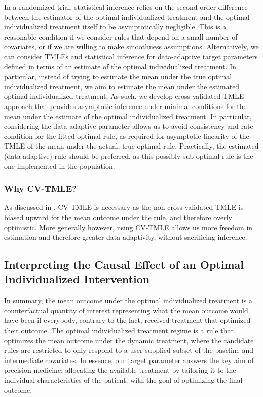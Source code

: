\documentclass[12pt, krantz2,]{krantz}
\theoremstyle{definition}
\theoremstyle{definition}
\theoremstyle{definition}
\newcommand{\1}{\mathbbm{1}}
\begin{document}
In a randomized trial, statistical inference relies on the second-order
difference between the estimator of the optimal individualized treatment and the
optimal individualized treatment itself to be asymptotically negligible. This is
a reasonable condition if we consider rules that depend on a small number of
covariates, or if we are willing to make smoothness assumptions. Alternatively,
we can consider TMLEs and statistical inference for data-adaptive target
parameters defined in terms of an estimate of the optimal individualized
treatment. In particular, instead of trying to estimate the mean under the true
optimal individualized treatment, we aim to estimate the mean under the
estimated optimal individualized treatment. As such, we develop cross-validated
TMLE approach that provides asymptotic inference under minimal conditions for
the mean under the estimate of the optimal individualized treatment. In
particular, considering the data adaptive parameter allows us to avoid
consistency and rate condition for the fitted optimal rule, as required for
asymptotic linearity of the TMLE of the mean under the actual, true optimal
rule. Practically, the estimated (data-adaptive) rule should be preferred, as
this possibly sub-optimal rule is the one implemented in the population.

\hypertarget{why-cv-tmle}{%
\subsubsection{Why CV-TMLE?}\label{why-cv-tmle}}

As discussed in \citet{vanderLaanLuedtke15}, CV-TMLE is necessary as the
non-cross-validated TMLE is biased upward for the mean outcome under the rule,
and therefore overly optimistic. More generally however, using CV-TMLE allows us
more freedom in estimation and therefore greater data adaptivity, without
sacrificing inference.

\hypertarget{interpreting-the-causal-effect-of-an-optimal-individualized-intervention}{%
\subsection{Interpreting the Causal Effect of an Optimal Individualized Intervention}\label{interpreting-the-causal-effect-of-an-optimal-individualized-intervention}}

In summary, the mean outcome under the optimal individualized treatment is a
counterfactual quantity of interest representing what the mean outcome would
have been if everybody, contrary to the fact, received treatment that optimized
their outcome. The optimal individualized treatment regime is a rule that
optimizes the mean outcome under the dynamic treatment, where the candidate
rules are restricted to only respond to a user-supplied subset of the baseline
and intermediate covariates. In essence, our target parameter answers the key
aim of precision medicine: allocating the available treatment by tailoring it to
the individual characteristics of the patient, with the goal of optimizing the
final outcome.
\end{document}
